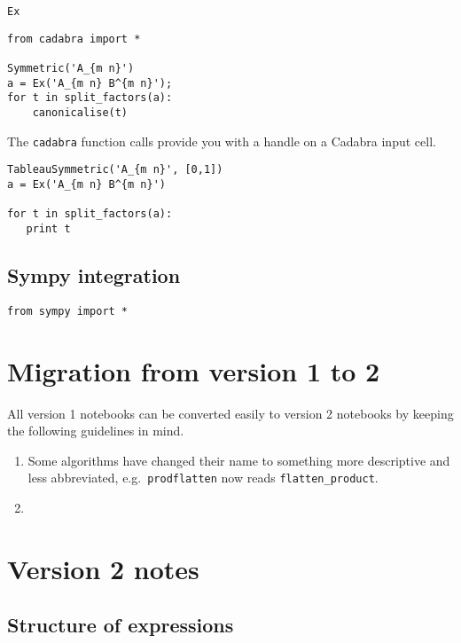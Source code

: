 \documentclass[11pt]{article}
\begin{document}
\begin{description}
\item[{\tt Ex}] 
\end{description}


\begin{lstlisting}
from cadabra import *

Symmetric('A_{m n}')
a = Ex('A_{m n} B^{m n}');
for t in split_factors(a):
    canonicalise(t)
\end{lstlisting}

The {\tt cadabra} function calls provide you with a handle on a
Cadabra input cell.

\begin{lstlisting}
TableauSymmetric('A_{m n}', [0,1])
a = Ex('A_{m n} B^{m n}')

for t in split_factors(a):
   print t   
\end{lstlisting}


\subsection{Sympy integration}

\begin{lstlisting}
from sympy import *
\end{lstlisting}


\section{Migration from version 1 to 2}

All version 1 notebooks can be converted easily to version 2 notebooks by 
keeping the following guidelines in mind.
\begin{enumerate}
\item Some algorithms have changed their name to something more descriptive
and less abbreviated, e.g.~{\tt prodflatten} now reads {\tt flatten\_product}.
\item 
\end{enumerate}


\section{Version 2 notes}

\subsection{Structure of expressions}
\end{document}
